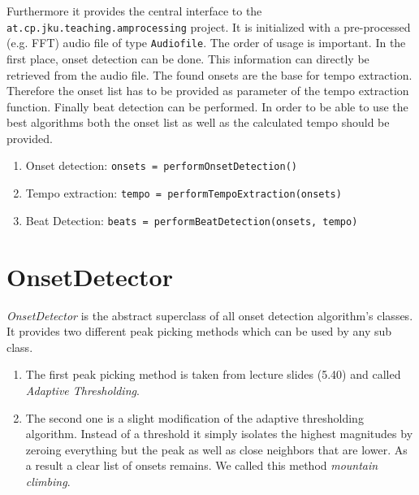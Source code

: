 Furthermore it provides the central interface to the
\texttt{at.cp.jku.teaching.am\-pro\-ces\-sing} project. It is initialized with a
pre-processed (e.g. FFT) audio file of type \texttt{Audiofile}. The order of
usage is important. In the first place, onset detection can be done. This
information can directly be retrieved from the audio file. The found onsets are
the base for tempo extraction. Therefore the onset list has to be provided as
parameter of the tempo extraction function. Finally beat detection can be
performed. In order to be able to use the best algorithms both the onset list as
well as the calculated tempo should be provided.

\begin{enumerate}
  \item Onset detection: \texttt{onsets = performOnsetDetection()}
  \item Tempo extraction: \texttt{tempo = performTempoExtraction(onsets)}
  \item Beat Detection: \texttt{beats = performBeatDetection(onsets, tempo)}
\end{enumerate}

\section{\ttfamily OnsetDetector} \label{sec:onset}
\emph{OnsetDetector} is the abstract superclass of all onset detection
algorithm's classes. It provides two different peak picking methods which can be
used by any sub class.

\begin{enumerate}
  \item The first peak picking method is taken from lecture slides (5.40) and
  called \emph{Adaptive Thresholding}.
  \item The second one is a slight modification of the adaptive thresholding
  algorithm. Instead of a threshold it simply isolates the highest magnitudes by
  zeroing everything but the peak as well as close neighbors that are lower. As
  a result a clear list of onsets remains. We called this method \emph{mountain
  climbing}.
\end{enumerate}

